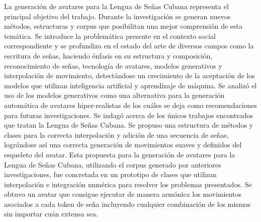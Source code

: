 \begin{conclusions}


  La generación de avatares para la Lengua de Señas Cubana representa el principal objetivo del trabajo. Durante la investigación se generan nuevos métodos, estructuras y corpus que posibilitan una mejor comprensión de esta temática. Se introduce la problemática presente en el contexto social correspondiente y se profundiza en el estado del arte de diversos campos como la escritura de señas, haciendo énfasis en su estructura y composición, reconocimiento de señas, tecnología de avatares, modelos generativos y  interpolación de movimiento, detectándose un crecimiento de la aceptación de los modelos que utilizan inteligencia artificial y  aprendizaje de máquina.
 	Se analizó el uso de los modelos generativos como una alternativa para la generación automática de avatares hiper-realistas de los cuáles se deja como recomendaciones para futuras investigaciones. Se indagó acerca de los únicos trabajos encontrados que tratan la Lengua de Señas Cubana. Se propuso una estructura de métodos y clases para la correcta interpolación y adición de una secuencia de señas, lográndose así una correcta generación de movimientos suaves y definidos del esqueleto del avatar. Esta propuesta para la generación de avatares para la Lengua de Señas Cubana, utilizando el corpus generado por anteriores investigaciones, fue concretada en un prototipo de clases que utilizan interpolación e integración numérica para resolver los problemas presentados.
 	Se obtuvo un avatar que consigue ejecutar de manera armónica los movimientos asociados a cada token de seña incluyendo cualquier combinación de los mismos sin importar cuán extensa sea.

\end{conclusions}
